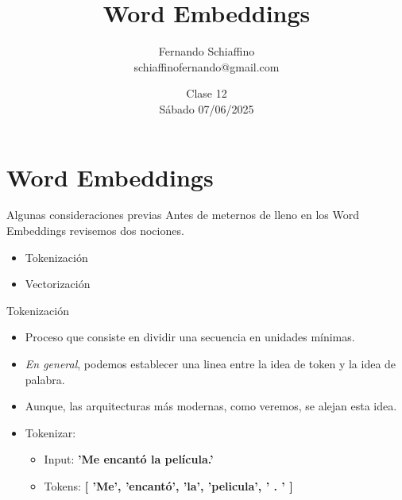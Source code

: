 \documentclass{beamer}
\title[Clase 12]{Word Embeddings}
\date[Sábado 07/06/2025]{Clase 12\\Sábado 07/06/2025}
\author[Fernando Schiaffino]{Fernando Schiaffino\\schiaffinofernando@gmail.com}
\begin{document}

\begin{frame}
\maketitle
\end{frame}

\section[tema 1.i]{Word Embeddings}




\begin{frame}{Algunas consideraciones previas}
Antes de meternos de lleno en los Word Embeddings revisemos dos nociones.
\begin{itemize}
\item Tokenización
\item Vectorización

\end{itemize}
\end{frame}

\begin{frame}{Tokenización}

\begin{itemize}
\item Proceso que consiste en dividir una secuencia en unidades mínimas.
\item \textit{En general}, podemos establecer una linea entre la idea de token y la idea de palabra.
\item Aunque, las arquitecturas más modernas, como veremos, se alejan esta idea.
\item Tokenizar:
\begin{itemize}
\item Input: \textbf{ 'Me encantó la película.' }
\item Tokens: \textbf{[ 'Me', 'encantó', 'la', 'pelicula', ' . ' ]}
\end{itemize}
\end{itemize}
\end{frame}
\end{document}
